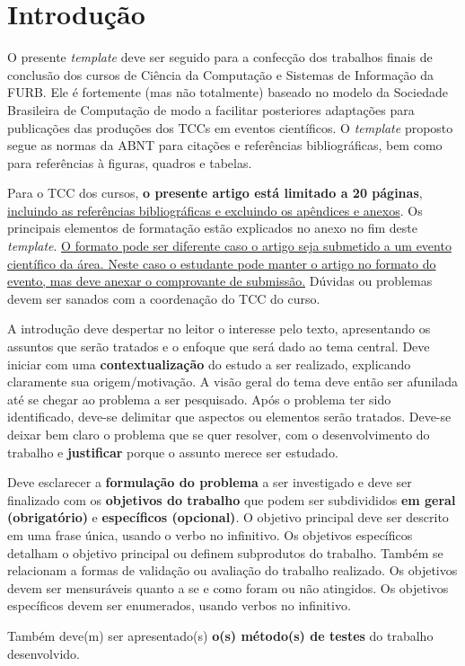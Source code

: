 \section{Introdução}\label{sec:introducao}

O presente \emph{template} deve ser seguido para a confecção dos
trabalhos finais de conclusão dos cursos de Ciência da Computação e
Sistemas de Informação da FURB. Ele é fortemente (mas não totalmente)
baseado no modelo da Sociedade Brasileira de Computação de modo a
facilitar posteriores adaptações para publicações das produções dos TCCs
em eventos científicos. O \emph{template} proposto segue as normas da
ABNT para citações e referências bibliográficas, bem como para
referências à figuras, quadros e tabelas.

Para o TCC dos cursos, \textbf{o presente artigo está limitado a 20
páginas}, \ul{incluindo as referências bibliográficas e excluindo os
apêndices e anexos}. Os principais elementos de formatação estão
explicados no anexo no fim deste \emph{template}. \ul{O formato pode ser
diferente caso o artigo seja submetido a um evento científico da área.
Neste caso o estudante pode manter o artigo no formato do evento, mas
deve anexar o comprovante de submissão.} Dúvidas ou problemas devem ser
sanados com a coordenação do TCC do curso.

A introdução deve despertar no leitor o interesse pelo texto,
apresentando os assuntos que serão tratados e o enfoque que será dado ao
tema central. Deve iniciar com uma \textbf{contextualização} do estudo a
ser realizado, explicando claramente sua origem/motivação. A visão geral
do tema deve então ser afunilada até se chegar ao problema a ser
pesquisado. Após o problema ter sido identificado, deve-se delimitar que
aspectos ou elementos serão tratados. Deve-se deixar bem claro o
problema que se quer resolver, com o desenvolvimento do trabalho e
\textbf{justificar} porque o assunto merece ser estudado.

Deve esclarecer a \textbf{formulação do problema} a ser investigado e
deve ser finalizado com os \textbf{objetivos do trabalho} que podem ser
subdivididos \textbf{em geral (obrigatório)} e \textbf{específicos
(opcional)}. O objetivo principal deve ser descrito em uma frase única,
usando o verbo no infinitivo. Os objetivos específicos detalham o
objetivo principal ou definem subprodutos do trabalho. Também se
relacionam a formas de validação ou avaliação do trabalho realizado. Os
objetivos devem ser mensuráveis quanto a se e como foram ou não
atingidos. Os objetivos específicos devem ser enumerados, usando verbos
no infinitivo.

Também deve(m) ser apresentado(s) \textbf{o(s) método(s) de testes} do
trabalho desenvolvido.
